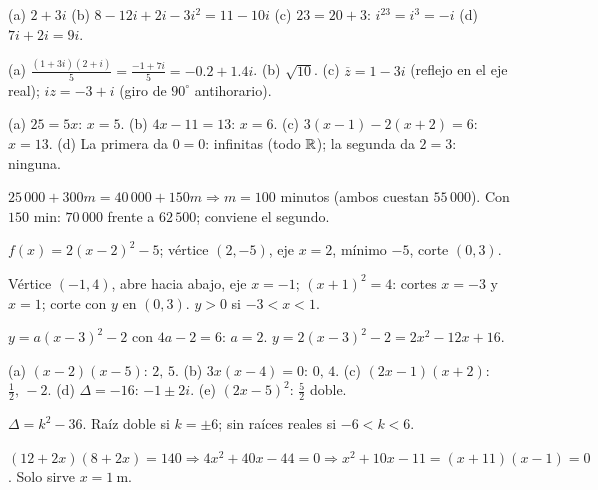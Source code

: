 \documentclass[11pt,a4paper]{article}
\newcommand{\conj}[1]{\overline{#1}}
\begin{document}
\respuestas
\begin{respuestascortas}
\begin{soluciones}
\item (a) $2+3i$ (b) $8-12i+2i-3i^2=11-10i$ (c) $23=20+3$: $i^{23}=i^3=-i$ (d) $7i+2i=9i$.
\item (a) $\frac{(1+3i)(2+i)}{5}=\frac{-1+7i}{5}=-0.2+1.4i$. (b) $\sqrt{10}$. (c) $\conj z=1-3i$ (reflejo en el eje real); $iz=-3+i$ (giro de $90^\circ$ antihorario).
\item (a) $25=5x$: $x=5$. (b) $4x-11=13$: $x=6$. (c) $3(x-1)-2(x+2)=6$: $x=13$. (d) La primera da $0=0$: infinitas (todo $\mathbb{R}$); la segunda da $2=3$: ninguna.
\item $25\,000+300m=40\,000+150m\Rightarrow m=100$ minutos (ambos cuestan $55\,000$). Con $150$ min: $70\,000$ frente a $62\,500$; conviene el segundo.
\item $f(x)=2(x-2)^2-5$; vértice $(2,-5)$, eje $x=2$, mínimo $-5$, corte $(0,3)$.
\item Vértice $(-1,4)$, abre hacia abajo, eje $x=-1$; $(x+1)^2=4$: cortes $x=-3$ y $x=1$; corte con $y$ en $(0,3)$. $y>0$ si $-3<x<1$.
\item $y=a(x-3)^2-2$ con $4a-2=6$: $a=2$. $y=2(x-3)^2-2=2x^2-12x+16$.
\item (a) $(x-2)(x-5)$: $2,\,5$. (b) $3x(x-4)=0$: $0,\,4$. (c) $(2x-1)(x+2)$: $\frac12,\,-2$. (d) $\Delta=-16$: $-1\pm2i$. (e) $(2x-5)^2$: $\frac52$ doble.
\item $\Delta=k^2-36$. Raíz doble si $k=\pm6$; sin raíces reales si $-6<k<6$.
\item $(12+2x)(8+2x)=140\Rightarrow4x^2+40x-44=0\Rightarrow x^2+10x-11=(x+11)(x-1)=0$. Solo sirve $x=\SI{1}{\metre}$.
\end{soluciones}
\end{respuestascortas}
\end{document}
